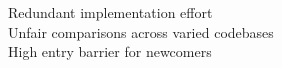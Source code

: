 \documentclass[preview]{standalone}
\begin{document}
Redundant implementation effort\\Unfair comparisons across varied codebases\\High entry barrier for newcomers\\
\end{document}
